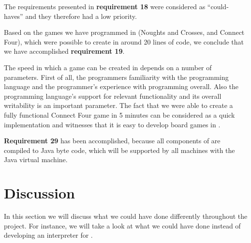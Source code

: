 The requirements presented in \textbf{requirement 18} were considered as
``could-haves'' and they therefore had a low priority.

Based on the games we have programmed in \productname{} (Noughts and Crosses,
and Connect Four), which were possible to create in around 20 lines of code, we
conclude that we have accomplished \textbf{requirement 19}.

The speed in which a game can be created in \productname{} depends on a number of
parameters. First of all, the programmers familiarity with the programming
language and the programmer's experience with programming overall. Also the
programming language's support for relevant functionality and its overall
writability is an important parameter. The fact that we were able to create a fully
functional Connect Four game in 5 minutes can be considered as a quick
implementation and witnesses that it is easy to develop board games in \productname{}.

\textbf{Requirement 29} has been accomplished, because all components of
\productname{} are compiled to Java byte code, which will be supported by all
machines with the Java virtual machine.

\section{Discussion}
\label{sec:discussion}

In this section we will discuss what we could have done differently throughout
the project. For instance, we will take a look at what we could have done
instead of developing an interpreter for \productname{}.








